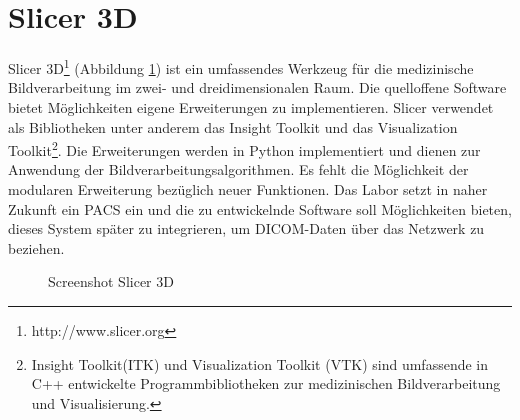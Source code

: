 \section{Slicer 3D}

Slicer 3D\footnote{http://www.slicer.org} (Abbildung \ref{slicer3d}) ist ein umfassendes Werkzeug für die medizinische Bildverarbeitung im zwei- und dreidimensionalen Raum. Die quelloffene Software bietet Möglichkeiten eigene Erweiterungen zu implementieren. Slicer verwendet als Bibliotheken unter anderem das Insight Toolkit und das Visualization Toolkit\footnote{Insight Toolkit(ITK) und Visualization Toolkit (VTK) sind umfassende in C++ entwickelte Programmbibliotheken zur medizinischen Bildverarbeitung und Visualisierung.}. Die Erweiterungen werden in Python implementiert und dienen zur Anwendung der Bildverarbeitungsalgorithmen. Es fehlt die Möglichkeit der modularen Erweiterung bezüglich neuer Funktionen. Das Labor setzt in naher Zukunft ein PACS ein und die zu entwickelnde Software soll Möglichkeiten bieten, dieses System später zu integrieren, um DICOM-Daten über das Netzwerk zu beziehen.

\begin{figure}[htbp]
  \vspace{0.5cm}
  \centering
  \caption{Screenshot Slicer 3D}
  \label{slicer3d}
  \vspace{0.5cm}
\end{figure}


